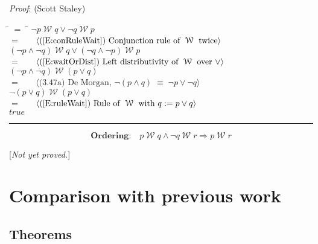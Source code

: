 \documentclass[12pt, fleqn, leqno]{article}
\newcommand{\lgap}{2pt}                             %
\newcommand{\mymathindent}{24pt}                    %
\newcommand{\equivs}{\ensuremath{\;\equiv\;}}       %
\newcommand{\impl}{\ensuremath{\Rightarrow}}        %
\newcommand{\Wait}{\;\mathcal{W}\;}
\newcommand{\myqed}{\rule[-.23ex]{1.2ex}{2.0ex}}
\newcommand{\myqedtab}{\hspace{384pt}}              %
\newcommand{\Gll} {\langle}                         %
\newcommand{\Ggg} {\rangle}                         %
\newcommand{\Hint}[1]     {\ \ \ $\Gll              \mbox{#1} \Ggg$ }   %
\begin{document}
\emph{Proof}: (Scott Staley)
\begin{tabbing}
\hspace{\mymathindent} \= $= \;$ \= \myqedtab \= \kill
  \> \>   $\neg p \Wait q \lor \neg q \Wait p$\\[\lgap]
  \> $=$ \> \Hint{(\ref{E:conRuleWait}) Conjunction rule of $\Wait$ twice}\\[\lgap]
  \> \>   $(\neg p\land \neg q) \Wait q \lor (\neg q \land \neg p)\Wait p$\\[\lgap]
  \> $=$  \>  \Hint{(\ref{E:waitOrDist}) Left distributivity of $\Wait$ over $\lor$}\\[\lgap]
  \> \>   $(\neg p\land \neg q) \Wait (p\lor q)$\\[\lgap]
  \> $=$  \>  \Hint{(3.47a) De Morgan, $\neg(p\land q)\equivs \neg p\lor\neg q$}\\[\lgap]
  \> \>   $\neg (p\lor q)\Wait (p\lor q)$\\[\lgap]
  \> $=$  \>  \Hint{(\ref{E:ruleWait}) Rule of $\Wait$ with $q := p\lor q$}\\[\lgap]
  \> \>   $true$ \quad \myqed
\end{tabbing}
\begin{equation}\label{E:waitOrderingTwo}
\textbf{Ordering:}\quad p \Wait q \land \neg q \Wait r \impl p \Wait r
\end{equation}

[\textit{Not yet proved.}]

\section{Comparison with previous work}

\subsection{Theorems}
\end{document}
